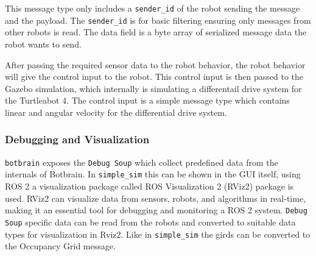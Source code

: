 This message type only includes a \texttt{sender\_id} of the robot sending the message and the payload. The \texttt{sender\_id} is for basic filtering ensuring only messages from other robots is read.
The data field is a byte array of serialized message data the robot wants to send.

After passing the required sensor data to the robot behavior, the robot behavior will give the control input to the robot. This control input is then passed to the Gazebo simulation, which internally is simulating a differentail drive system for the Turtleabot 4. The control input is a simple message type which contains linear and angular velocity for the differential drive system.

\subsubsection{Debugging and Visualization}\label{sec:debugging_rviz}
\texttt{botbrain} exposes the \texttt{Debug Soup} which collect predefined data from the internals of Botbrain. 
In \texttt{simple\_sim} this can be shown in the GUI itself, using ROS 2 a visualization package called ROS Visualization 2 (RViz2) package is used.
RViz2 can visualize data from sensors, robots, and algorithms in real-time, making it an essential tool for debugging and monitoring a ROS 2 system.
\texttt{Debug Soup} specific data can be read from the robots and converted to suitable data types for visualization in Rviz2. Like in \texttt{simple\_sim} the girds can be converted to the Occupancy Grid message.
